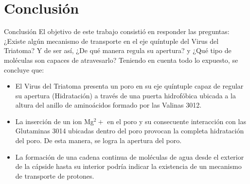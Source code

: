 \documentclass[8pt]{beamer}
\begin{document}
%
%

\section{Conclusión}
\begin{frame}{Conclusión}
El objetivo de este trabajo consistió en responder las preguntas: ¿Existe algún
mecanismo de transporte en el eje quíntuple del Virus del Triatoma? Y de ser así, ¿De
qué manera regula su apertura? y ¿Qué tipo de moléculas son capaces de atravesarlo?
Teniendo en cuenta todo lo expuesto, se concluye que:
\begin{itemize}
\item<2-> El Virus del Triatoma presenta un poro en su eje quíntuple capaz de regular su apertura (Hidratación) a través de una puerta hidrofóbica ubicada a la altura del anillo de aminoácidos formado por las Valinas 3012.
\item<2-> La inserción de un ion Mg$^2+$ en el poro y su consecuente interacción con las Glutaminas 3014 ubicadas dentro del poro provocan la completa hidratación del poro. De esta manera, se logra la apertura del poro.
\item<2-> La formación de una cadena continua de moléculas de agua desde el exterior de la cápside hasta su interior podría indicar la existencia de un mecanismo de transporte de protones.
\end{itemize}
\end{frame}
\end{document}
